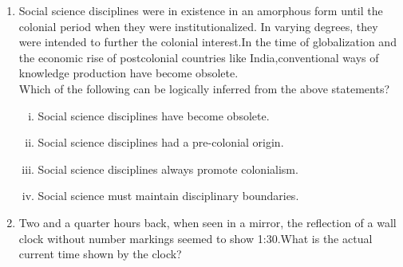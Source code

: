 \documentclass[journal,12pt,twocolumn]{IEEEtran}
\begin{document}
\begin{enumerate}
\item Social science disciplines were in existence in an amorphous form until the colonial period when they were institutionalized. In varying degrees, they were intended to further the colonial interest.In the time of globalization and the economic rise of postcolonial countries like India,conventional ways of knowledge production have become obsolete.\\
  
  Which of the following can be logically inferred from the above statements?
  \begin{enumerate}[(i)]
\item Social science disciplines have become obsolete.
\item Social science disciplines had a pre-colonial origin.
\item Social science disciplines always promote colonialism.
\item Social science must maintain disciplinary boundaries.
\end{enumerate}
\begin{enumerate}[A]
\end{enumerate}

\item Two and a quarter hours back, when seen in a mirror, the reflection of a wall clock without number markings seemed to show 1:30.What is the actual current time shown by the clock?
\begin{enumerate}
\setlength\itemsep{2em}
\end{enumerate}


\end{enumerate}
\end{document}
